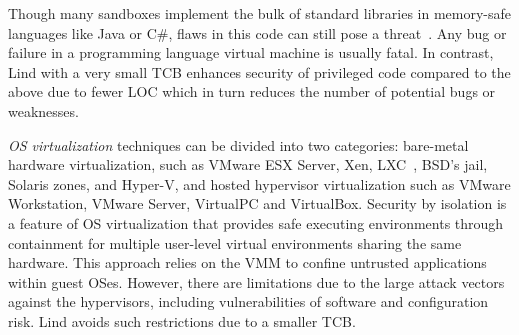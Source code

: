 
Though many sandboxes implement the bulk of standard libraries in
memory-safe languages like Java or C\#, flaws in this code can
still pose a threat~\cite{JavaBugs, Java-Lessons}. 
Any bug or failure in a programming language virtual
machine is usually fatal. In contrast, Lind with a very small TCB
enhances security of privileged code compared to the above due to fewer LOC which in turn reduces the number of potential bugs or weaknesses. %


\textit{OS virtualization}
techniques can be divided into two categories:
bare-metal hardware virtualization, such as VMware ESX Server, Xen,
LXC~\cite{LXC}, BSD's jail, Solaris zones, and Hyper-V, and
hosted hypervisor virtualization such as VMware
Workstation, VMware Server, VirtualPC and VirtualBox.
%
Security by isolation \cite{Qubes, Overshadow, SecureVM, HypSec} is a feature of OS virtualization that
provides safe executing environments through containment for multiple
user-level virtual environments sharing the same hardware. This
approach relies on the VMM to confine untrusted applications within
guest OSes. However, there are limitations due to
the large attack vectors against the hypervisors, including
vulnerabilities of software and configuration risk. Lind avoids such restrictions due to a smaller TCB.

